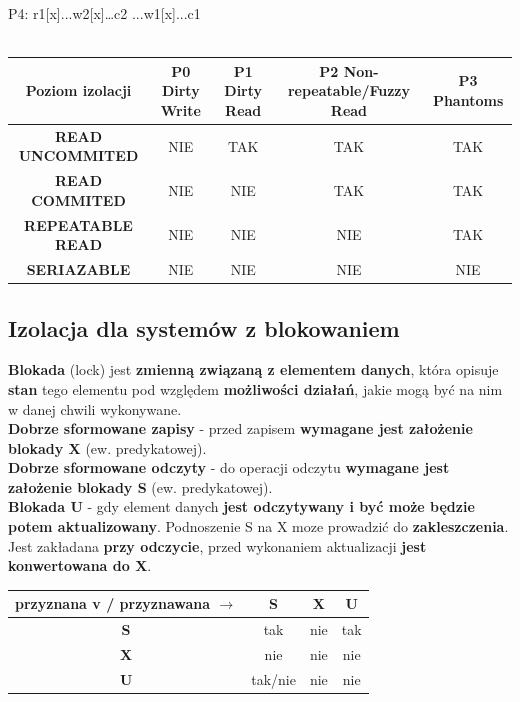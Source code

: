 \documentclass[a4paper]{article}
\begin{document}
    P4: r1[x]...w2[x]…c2 ...w1[x]...c1\\\\

    \begin{tabular}{|c||c|c|c|c|}
        \hline
        \textbf{Poziom izolacji} & \textbf{P0} Dirty Write & \textbf{P1} Dirty Read & \textbf{P2} Non-repeatable/Fuzzy Read & \textbf{P3} Phantoms \\
        \hline
        \hline
        \textbf{READ UNCOMMITED} & NIE & TAK & TAK & TAK \\
        \hline
        \textbf{READ COMMITED} & NIE & NIE & TAK & TAK \\
        \hline
        \textbf{REPEATABLE READ} & NIE & NIE & NIE & TAK\\
        \hline
        \textbf{SERIAZABLE} & NIE & NIE & NIE & NIE\\
        \hline
    \end{tabular}

    \subsection{Izolacja dla systemów z blokowaniem}
    \textbf{Blokada} (lock) jest \textbf{zmienną związaną z elementem danych}, która opisuje \textbf{stan} tego elementu
    pod względem \textbf{możliwości działań}, jakie mogą być na nim w danej chwili wykonywane.\\

    \textbf{Dobrze sformowane zapisy} - przed zapisem \textbf{wymagane jest założenie blokady X} (ew. predykatowej).\\
    \textbf{Dobrze sformowane odczyty} - do operacji odczytu \textbf{wymagane jest założenie blokady S} (ew. predykatowej).\\

    \textbf{Blokada U} - gdy element danych \textbf{jest odczytywany i być może będzie potem aktualizowany}.
    Podnoszenie S na X moze prowadzić do \textbf{zakleszczenia}. Jest zakładana \textbf{przy odczycie}, przed wykonaniem
    aktualizacji \textbf{jest konwertowana do X}.\\

    \begin{tabular}{|c||c|c|c|}
        \hline
        \textbf{przyznana} v / \textbf{przyznawana} $\rightarrow$ & \textbf{S} & \textbf{X} & \textbf{U} \\
        \hline
        \hline
        \textbf{S} & tak & nie & tak\\
        \hline
        \textbf{X} & nie & nie & nie\\
        \hline
        \textbf{U} & tak/nie & nie & nie\\
        \hline
    \end{tabular}
\end{document}
